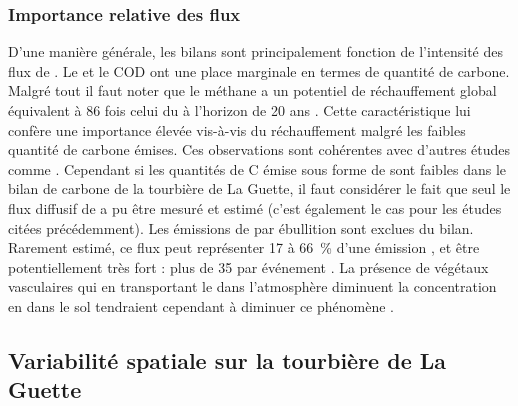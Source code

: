 




\subsubsection{Importance relative des flux}

D'une manière générale, les bilans sont principalement fonction de l'intensité des flux de \coo.
Le \chh et le COD ont une place marginale en termes de quantité de carbone.
Malgré tout il faut noter que le méthane a un potentiel de réchauffement global équivalent à 86 fois celui du \coo à l'horizon de 20 ans \citep{myhre2013}.
Cette caractéristique lui confère une importance élevée vis-à-vis du réchauffement malgré les faibles quantité de carbone émises.
Ces observations sont cohérentes avec d'autres études comme \citet{bortoluzzi2006a,worrall2009}.
Cependant si les quantités de C émise sous forme de \chh sont faibles dans le bilan de carbone de la tourbière de La Guette, il faut considérer le fait que seul le flux diffusif de \chh a pu être mesuré et estimé (c'est également le cas pour les études citées précédemment).
Les émissions de \chh par ébullition sont exclues du bilan.
Rarement estimé, ce flux peut représenter 17 à \SI{66}{\percent} d'une émission \citep{gogo2011,christensen2003}, et être potentiellement très fort : plus de \SI{35}{\gcm} par événement \citep{glaser2009}.
La présence de végétaux vasculaires qui en transportant le \chh dans l'atmosphère diminuent la concentration en \chh dans le sol tendraient cependant à diminuer ce phénomène \citep{chanton2005}.



\subsection{Variabilité spatiale sur la tourbière de La Guette}

